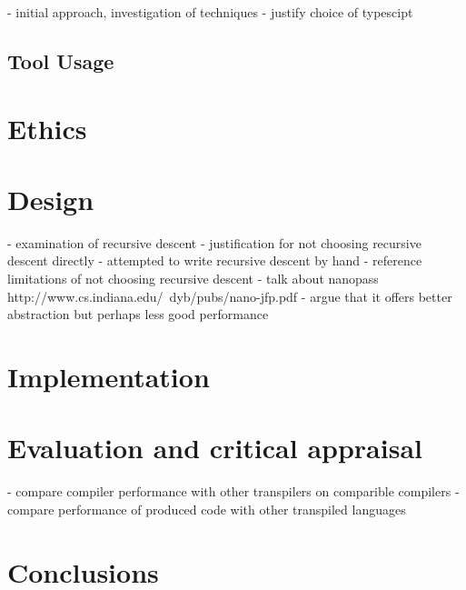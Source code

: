 \documentclass{article}
\begin{document}
- initial approach, investigation of techniques
- justify choice of typescipt

\subsection{Tool Usage}

\section{Ethics}

\section{Design}
 
- examination of recursive descent 
- justification for not choosing recursive descent directly
    - attempted to write recursive descent by hand
- reference limitations of not choosing recursive descent
- talk about nanopass
 http://www.cs.indiana.edu/~dyb/pubs/nano-jfp.pdf
- argue that it offers better abstraction but perhaps less good performance

\section{Implementation}
 
\section{Evaluation and critical appraisal}


- compare compiler performance with other transpilers on comparible compilers
- compare performance of produced code with other transpiled languages

\section{Conclusions}
\end{document}
